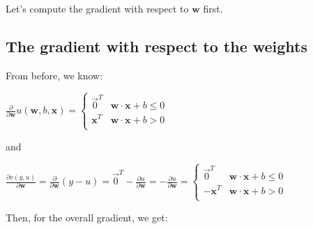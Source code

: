 \documentclass[11pt]{article}
\begin{document}
Let's compute the gradient with respect to $\mathbf{w}$ first.

\subsection{The gradient with respect to the weights}

From before, we know:

$\frac{\partial }{\partial \mathbf{w}} u(\mathbf{w},b,\mathbf{x}) = \begin{cases}
	\vec{0}^T & \mathbf{w} \cdot \mathbf{x} + b \leq 0\\
	\mathbf{x}^T & \mathbf{w} \cdot \mathbf{x} + b > 0\\
\end{cases}$

and

$\frac{\partial v(y,u)}{\partial \mathbf{w}} = \frac{\partial}{\partial \mathbf{w}} (y - u) = \vec{0}^T - \frac{\partial u}{\partial \mathbf{w}} = -\frac{\partial u}{\partial \mathbf{w}} = \begin{cases}
	\vec{0}^T & \mathbf{w} \cdot \mathbf{x} + b \leq 0\\
	-\mathbf{x}^T & \mathbf{w} \cdot \mathbf{x} + b > 0\\
\end{cases}$

Then, for the overall gradient, we get:
\end{document}
